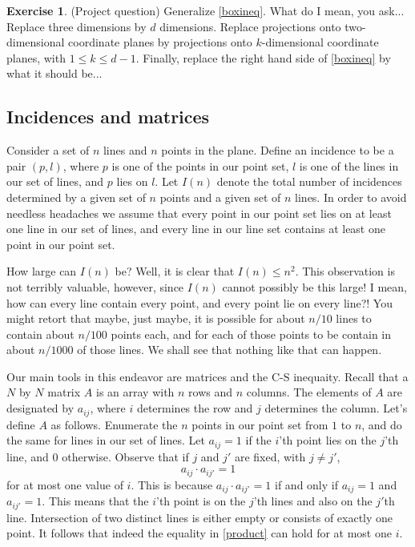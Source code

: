 \documentclass[]{stml-l}
\numberwithin{equation}{chapter}
\theoremstyle{plain}
\theoremstyle{definition}
\newtheorem{exercise}{Exercise}[chapter]
\theoremstyle{remark}
\begin{document}
\begin{exercise} (Project question) Generalize \ref{boxineq}. What do I
mean, you ask... Replace three dimensions by $d$ dimensions. Replace
projections onto two-dimensional coordinate planes by projections onto
$k$-dimensional coordinate planes, with $1 \leq k \leq d-1$. Finally,
replace the right hand side of \ref{boxineq} by what it should be...
\end{exercise}

\subsection{Incidences and matrices} Consider a set of $n$ lines
and $n$ points in the plane. Define an incidence to be a pair $(p,l)$,
where $p$ is one of the points in our point set, $l$ is one of the lines
in our set of lines, and $p$ lies on $l$. Let $I(n)$ denote the total
number of incidences determined by a given set of $n$ points and a given
set of $n$ lines. In order to avoid needless headaches we assume that
every point in our point set lies on at least one line in our set of
lines, and every line in our line set contains at least one point in our
point set.

How large can $I(n)$ be? Well, it is clear that $I(n) \leq n^2$. This
observation is not terribly valuable, however, since $I(n)$ cannot
possibly be this large! I mean, how can every line contain every point,
and every point lie on every line?! You might retort that maybe, just
maybe, it is possible for about $n/10$ lines to contain about $n/100$
points each, and for each of those points to be contain in about $n/1000$
of those lines. We shall see that nothing like that can happen.

Our main tools in this endeavor are matrices and the C-S inequaity. Recall
that a $N$ by $N$ matrix $A$ is an array with $n$ rows and $n$ columns.
The elements of $A$ are designated by $a_{ij}$, where $i$ determines the
row and $j$ determines the column. Let's define $A$ as follows.
Enumerate the $n$ points in our point set from $1$ to $n$, and do the
same for lines in our set of lines. Let $a_{ij}=1$ if the $i$'th point
lies on the $j$'th line, and $0$ otherwise. Observe that if $j$ and $j'$
are fixed, with $j \not=j'$,
\begin{equation} \label{product} a_{ij} \cdot a_{ij'}=1 \end{equation} for at most one value of $i$. This
is because $a_{ij} \cdot a_{ij'}=1$ if and only if $a_{ij}=1$ and
$a_{ij'}=1$. This means that the $i$'th point is on the $j$'th lines and
also on the $j'$th line. Intersection of two distinct lines is either
empty or consists of exactly one point. It follows that indeed the
equality in \ref{product} can hold for at most one $i$.
\end{document}
